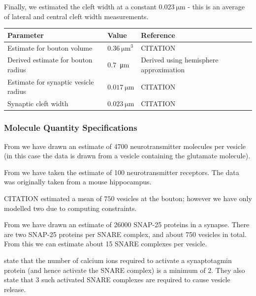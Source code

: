 \documentclass[a4paper]{article}
\begin{document}
Finally, we estimated the cleft width at a constant $\SI{0.023}{\micro\meter}$ - this is an average of lateral and central cleft width measurements.

\begin{table}[H]
\begin{tabular}{lll}
Parameter & Value & Reference \\ \hline
Estimate for bouton volume&  $\SI{0.36}{\micro\meter\cubed}$& CITATION \\ 
Derived estimate for bouton radius & \SI{0.7}{\micro\meter} & Derived using hemisphere approximation\\
Estimate for synaptic vesicle radius & $\SI{0.017}{\micro\meter}$ & CITATION \\ 
Synaptic cleft width &$\SI{0.023}{\micro\meter}$& CITATION\\
\end{tabular}
\end{table}

\subsubsection{Molecule Quantity Specifications}
From \cite{Bruns:Nature:1995} we have drawn an estimate of 4700 neurotransmitter molecules per vesicle (in this case the data is drawn from a vesicle containing the glutamate molecule).

From \cite{Stricker:JPhysiol:1996} we have taken the estimate of 100 neurotransmitter receptors. The data was originally taken from a mouse hippocampus. 

CITATION estimated a mean of $750$ vesicles at the bouton; however we have only modelled two due to computing constraints.

From \cite{Wilhelm:Science:2014} we have drawn an estimate of 26000 SNAP-25 proteins in a synapse. There are two SNAP-25 proteins per SNARE complex, and about 750 vesicles in total. From this we can estimate about 15 SNARE complexes per vesicle. 

\cite{Dittrich:BiophysJ:2013} state that the number of calcium ions required to activate a synaptotagmin protein (and hence activate the SNARE complex) is a minimum of 2. They also state that 3 such activated SNARE complexes are required to cause vesicle release. 
\end{document}
